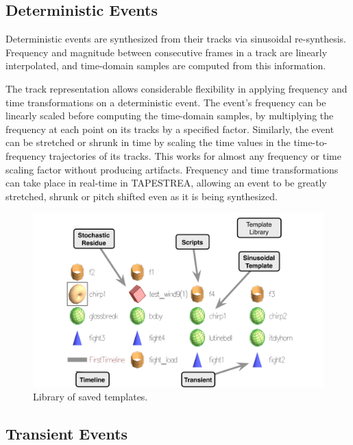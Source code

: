 \documentclass[10pt,letterpaper]{article}
\begin{document}
\subsection{Deterministic Events} 

Deterministic events are synthesized from their tracks via sinusoidal
re-synthesis. Frequency and magnitude between consecutive frames in a
track are linearly interpolated, and time-domain samples are computed
from this information. 

The track representation allows considerable flexibility in applying
frequency and time transformations on a deterministic event. The event's
frequency can be linearly scaled before computing
the time-domain samples, by multiplying the frequency at each point on
its tracks by a specified factor. Similarly, the event can be stretched
or shrunk in time by scaling the time values in the time-to-frequency
trajectories of its tracks. This works for almost any
frequency or time scaling factor without producing artifacts. Frequency
and time transformations can take place in real-time in TAPESTREA, 
allowing an event to be greatly stretched, shrunk or pitch shifted even
as it is being synthesized.

\begin{figure}[h]
  \begin{center}
    \includegraphics[width=1\columnwidth]{ui_library.pdf}
    \caption{Library of saved templates.} 
    \label{fig:ui_library}
  \end{center}
\end{figure}

\subsection{Transient Events} 
\end{document}
